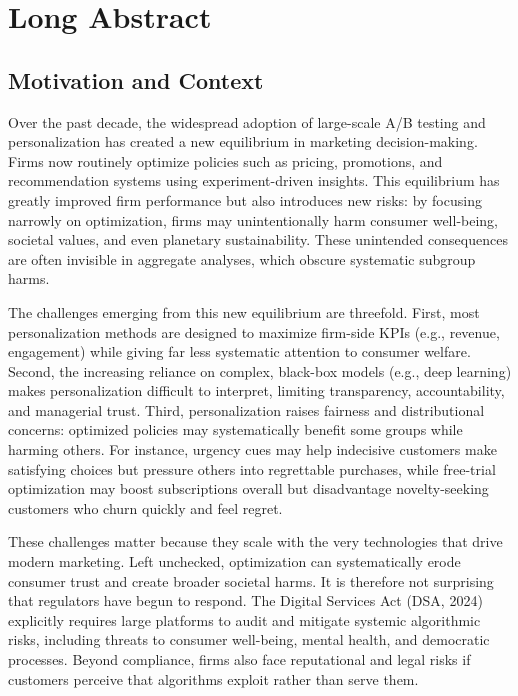 \documentclass[11pt,letterpaper,english]{article}
\begin{document}
\section{Long Abstract}
\subsection{Motivation and Context}

Over the past decade, the widespread adoption of large-scale A/B testing and personalization has created a new equilibrium in marketing decision-making. Firms now routinely optimize policies such as pricing, promotions, and recommendation systems using experiment-driven insights. This equilibrium has greatly improved firm performance but also introduces new risks: by focusing narrowly on optimization, firms may unintentionally harm consumer well-being, societal values, and even planetary sustainability. These unintended consequences are often invisible in aggregate analyses, which obscure systematic subgroup harms.

The challenges emerging from this new equilibrium are threefold. First, most personalization methods are designed to maximize firm-side KPIs (e.g., revenue, engagement) while giving far less systematic attention to consumer welfare. Second, the increasing reliance on complex, black-box models (e.g., deep learning) makes personalization difficult to interpret, limiting transparency, accountability, and managerial trust. Third, personalization raises fairness and distributional concerns: optimized policies may systematically benefit some groups while harming others. For instance, urgency cues may help indecisive customers make satisfying choices but pressure others into regrettable purchases, while free-trial optimization may boost subscriptions overall but disadvantage novelty-seeking customers who churn quickly and feel regret.

These challenges matter because they scale with the very technologies that drive modern marketing. Left unchecked, optimization can systematically erode consumer trust and create broader societal harms. It is therefore not surprising that regulators have begun to respond. The Digital Services Act (DSA, 2024) explicitly requires large platforms to audit and mitigate systemic algorithmic risks, including threats to consumer well-being, mental health, and democratic processes. Beyond compliance, firms also face reputational and legal risks if customers perceive that algorithms exploit rather than serve them.
\end{document}
